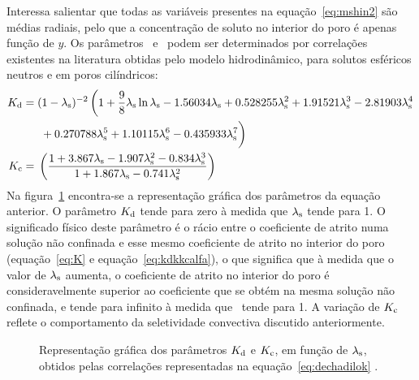%
%
Interessa salientar que todas as variáveis presentes na equação~\ref{eq:mshin2} são médias radiais, pelo que a concentração de soluto no interior do poro é apenas função de $y$.
Os parâmetros \kapade\ e \kapace\ podem ser determinados por correlações existentes na literatura \cite{dechadilok} obtidas pelo modelo hidrodinâmico, para solutos esféricos neutros e em poros cilíndricos:
\begin{equation}
\label{eq:dechadilok}
	\begin{split}
\kapade = {} & (1-\lambdas)^{-2}\left(1+\frac{9}{8}\lambdas\ln\lambdas-1.56034\lambdas+0.528255\lambdas^2+1.91521\lambdas^3-2.81903\lambdas^4\right. \\
& \left.\vphantom{\frac{9}{8}}+0.270788\lambdas^5+1.10115\lambdas^6-0.435933\lambdas^7\right) \\
\kapace = {} & \left( \frac{1+3.867\lambdas-1.907\lambdas^2-0.834\lambdas^3}{1+1.867\lambdas-0.741\lambdas^2}\right)
	\end{split}
\end{equation}
Na figura~\ref{fig:kdekc} encontra-se a representação gráfica dos parâmetros da equação anterior. O parâmetro $\kapade$ tende para zero à medida que $\lambda_{\mathrm{s}}$ tende para 1. O significado físico deste parâmetro é o rácio entre o coeficiente de atrito numa solução não confinada e esse mesmo coeficiente de atrito no interior do poro (equação~\ref{eq:K} e equação~\ref{eq:kdkkcalfa}), o que significa que à medida que o valor de $\lambda_{\mathrm{s}}$ aumenta, o coeficiente de atrito no interior do poro é consideravelmente superior ao coeficiente que se obtém na mesma solução não confinada, e tende para infinito à medida que \lambdas\ tende para 1. A variação de $\kapace$ reflete o comportamento da seletividade convectiva discutido anteriormente. 
\begin{figure}
\centering

\caption[Representação gráfica dos parâmetros $\kapade$ e $\kapace$]{Representação gráfica dos parâmetros $\kapade$ e $\kapace$, em função de $\lambda_{\mathrm{s}}$, obtidos pelas correlações representadas na equação~\ref{eq:dechadilok} \cite{dechadilok}.}
\label{fig:kdekc}
\end{figure}

